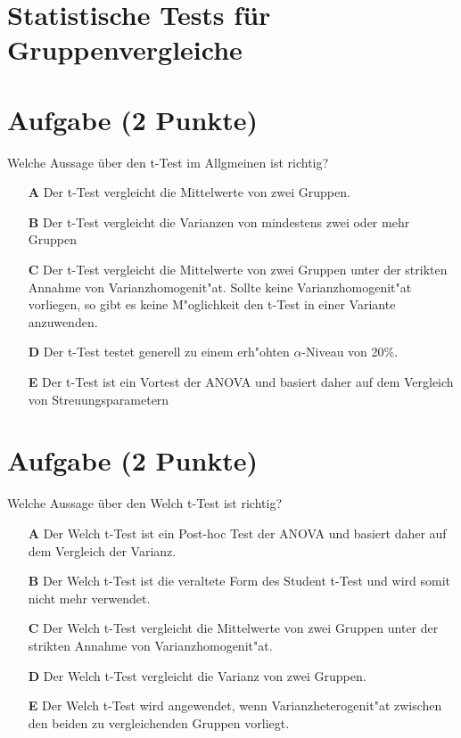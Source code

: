 \documentclass[a4paper, 9pt]{scrartcl}\usepackage[]{graphicx}\usepackage[]{xcolor}
\begin{document}
\section*{Statistische Tests f{\"u}r Gruppenvergleiche} 

\section{Aufgabe \hfill (2 Punkte)}

Welche Aussage {\"u}ber den t-Test im Allgmeinen ist richtig? 



\begin{enumerate}
\item [\textbf{A} \msquare] Der t-Test vergleicht die Mittelwerte von zwei Gruppen.
\item [\textbf{B} \msquare] Der t-Test vergleicht die Varianzen von mindestens zwei oder mehr Gruppen
\item [\textbf{C} \msquare] Der t-Test vergleicht die Mittelwerte von zwei Gruppen unter der strikten Annahme von Varianzhomogenit{"a}t. Sollte keine Varianzhomogenit{"a}t vorliegen, so gibt es keine M{"o}glichkeit den t-Test in einer Variante anzuwenden.
\item [\textbf{D} \msquare] Der t-Test testet generell zu einem erh{"o}hten $\alpha$-Niveau von 20\%.
\item [\textbf{E} \msquare] Der t-Test ist ein Vortest der ANOVA und basiert daher auf dem Vergleich von Streuungsparametern
\end{enumerate}

\section{Aufgabe \hfill (2 Punkte)}

Welche Aussage {\"u}ber den Welch t-Test ist richtig?



\begin{enumerate}
\item [\textbf{A} \msquare] Der Welch t-Test ist ein Post-hoc Test der ANOVA und basiert daher auf dem Vergleich der Varianz.
\item [\textbf{B} \msquare] Der Welch t-Test ist die veraltete Form des Student t-Test und wird somit nicht mehr verwendet.
\item [\textbf{C} \msquare] Der Welch t-Test vergleicht die Mittelwerte von zwei Gruppen unter der strikten Annahme von Varianzhomogenit{"a}t.
\item [\textbf{D} \msquare] Der Welch t-Test vergleicht die Varianz von zwei Gruppen.
\item [\textbf{E} \msquare] Der Welch t-Test wird angewendet, wenn Varianzheterogenit{"a}t zwischen den beiden zu vergleichenden Gruppen vorliegt.
\end{enumerate}
\end{document}

